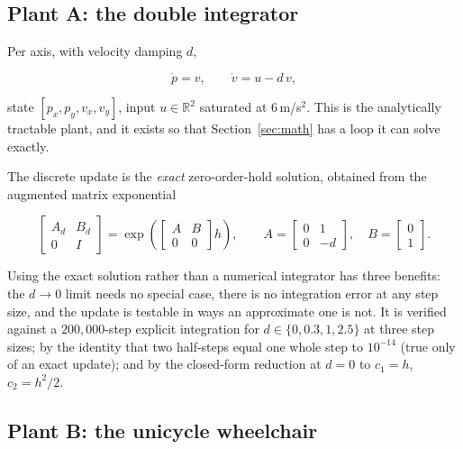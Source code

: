 \documentclass[11pt,a4paper]{article}
\theoremstyle{plain}
\theoremstyle{definition}
\begin{document}
\subsection{Plant A: the double integrator}

Per axis, with velocity damping $d$,

\begin{equation}
\dot p = v, \qquad \dot v = u - d\,v,
\label{eq:di}
\end{equation}

state $[p_x, p_y, v_x, v_y]$, input $u \in \mathbb{R}^2$ saturated at
$6$\,m/s$^2$. This is the analytically tractable plant, and it exists so
that Section~\ref{sec:math} has a loop it can solve exactly.

The discrete update is the \emph{exact} zero-order-hold solution,
obtained from the augmented matrix exponential

\begin{equation}
\begin{bmatrix} A_d & B_d \\ 0 & I \end{bmatrix}
= \exp\!\left(
\begin{bmatrix} A & B \\ 0 & 0\end{bmatrix} h \right),
\qquad
A = \begin{bmatrix} 0 & 1 \\ 0 & -d\end{bmatrix},
\quad
B = \begin{bmatrix} 0 \\ 1 \end{bmatrix}.
\label{eq:zoh}
\end{equation}

Using the exact solution rather than a numerical integrator has three
benefits: the $d \to 0$ limit needs no special case, there is no
integration error at any step size, and the update is testable in ways
an approximate one is not. It is verified against a $200{,}000$-step
explicit integration for $d \in \{0, 0.3, 1, 2.5\}$ at three step sizes;
by the identity that two half-steps equal one whole step to $10^{-14}$
(true only of an exact update); and by the closed-form reduction at
$d = 0$ to $c_1 = h$, $c_2 = h^2/2$.

\subsection{Plant B: the unicycle wheelchair}
\end{document}
